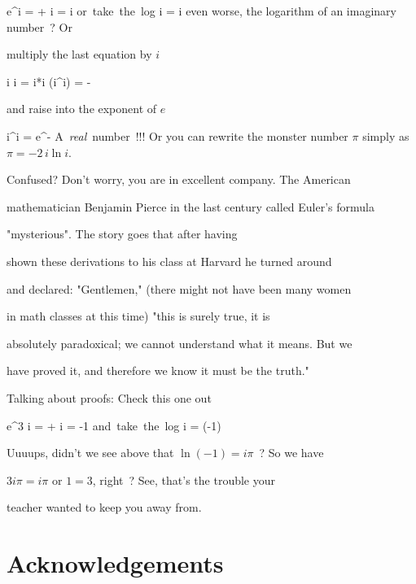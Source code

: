 \bnn
  e^{i } = \cos{} + i \sin{} = i
       \quad \mbox{or take the log} \quad \ln i = i 
\enn even worse, the logarithm of an imaginary number~? Or

multiply the last equation by $i$

\bnn
    i \ln i = i*i  \quad \mbox \quad \ln(i^i) = -
\enn

 and raise into the exponent of $e$

\bnn
    i^i = e^{-}  \quad
          \mbox{A {\em real} number !!!}
\enn Or you can rewrite the monster number $\pi$ simply as $\pi=-2\,i \ln i$.



Confused? Don't worry, you are in excellent company. The American

mathematician Benjamin Pierce in the last century called Euler's formula

"mysterious". The story goes that after having

shown these derivations to his class at Harvard he turned around

and declared: "Gentlemen," (there might not have been many women

in math classes at this time) "this is surely true, it is

absolutely paradoxical; we cannot understand what it means. But we

have proved it, and therefore we know it must be the truth."



Talking about proofs: Check this one out

\bnn
   e^{3 i \pi} = \pi + i  \pi = -1 \quad \mbox{and take the log}
       i \pi = \ln (-1)
\enn



Uuuups, didn't we see above that $\ln (-1) = i \pi$~? So we have

$3 i \pi = i \pi$ or $1=3$, right~? See, that's the trouble your

teacher wanted to keep you away from.







\section{Acknowledgements}



